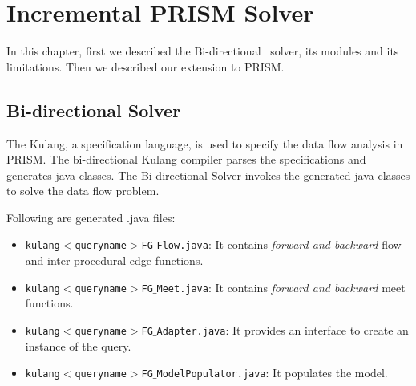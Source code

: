 \documentclass[11pt,a4paper,openright]{report}
\begin{document}

\chapter{Incremental PRISM Solver}
In this chapter, first we described the Bi-directional~\cite{thesis_v} solver, its modules and its limitations.
Then we described our extension to PRISM.

\section{Bi-directional Solver}
The Kulang, a specification language, is used to specify the data flow analysis in PRISM. The bi-directional Kulang compiler parses the specifications
and generates java classes. The Bi-directional Solver invokes the generated java classes to solve the data flow problem.

Following are generated .java files:
\begin{itemize}
 \item \texttt{kulang$<$queryname$>$FG$\_$Flow.java}: It contains \textit{forward and backward} flow and inter-procedural edge functions.  
 \item \texttt{kulang$<$queryname$>$FG$\_$Meet.java}: It contains \textit{forward and backward} meet functions.
 \item \texttt{kulang$<$queryname$>$FG$\_$Adapter.java}: It provides an interface to create an instance of the query. 
 \item \texttt{kulang$<$queryname$>$FG$\_$ModelPopulator.java}: It populates the model.
\end{itemize}
\end{document}
